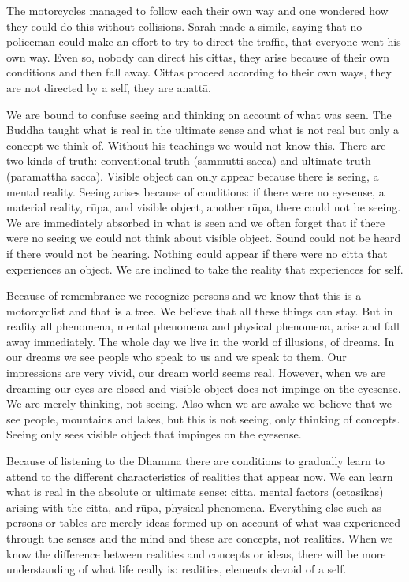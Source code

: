 The motorcycles managed to follow each
their own way and one wondered how they could do this without
collisions. Sarah made a simile, saying that no policeman could make an
effort to try to direct the traffic, that everyone went his own way.
Even so, nobody can direct his cittas, they arise because of their own
conditions and then fall away. Cittas proceed according to their own
ways, they are not directed by a self, they are anattā. 

We are bound to confuse seeing and
thinking on account of what was seen. The Buddha taught what is real in
the ultimate sense and what is not real but only a concept we think of.
Without his teachings we would not know this. There are two kinds of
truth: conventional truth (sammutti sacca) and ultimate truth
(paramattha sacca). Visible object can only appear because there is
seeing, a mental reality. Seeing arises because of conditions: if there
were no eyesense, a material reality, rūpa, and visible object, another
rūpa, there could not be seeing. We are immediately absorbed in what is
seen and we often forget that if there were no seeing we could not think
about visible object. Sound could not be heard if there would not be
hearing. Nothing could appear if there were no citta that experiences an
object. We are inclined to take the reality that experiences for self. 

Because of remembrance we recognize
persons and we know that this is a motorcyclist and that is a tree. We
believe that all these things can stay. But in reality all phenomena,
mental phenomena and physical phenomena, arise and fall away
immediately. The whole day we live in the world of illusions, of dreams.
In our dreams we see people who speak to us and we speak to them. Our
impressions are very vivid, our dream world seems real. However, when we
are dreaming our eyes are closed and visible object does not impinge on
the eyesense. We are merely thinking, not seeing. Also when we are awake
we believe that we see people, mountains and lakes, but this is not
seeing, only thinking of concepts. Seeing only sees visible object that
impinges on the eyesense. 

Because of listening to the Dhamma
there are conditions to gradually learn to attend to the different
characteristics of realities that appear now. We can learn what is real
in the absolute or ultimate sense: citta, mental factors (cetasikas)
arising with the citta, and rūpa, physical phenomena. Everything else
such as persons or tables are merely ideas formed up on account of what
was experienced through the senses and the mind and these are concepts,
not realities. When we know the difference between realities and
concepts or ideas, there will be more understanding of what life really
is: realities, elements devoid of a
self. 

